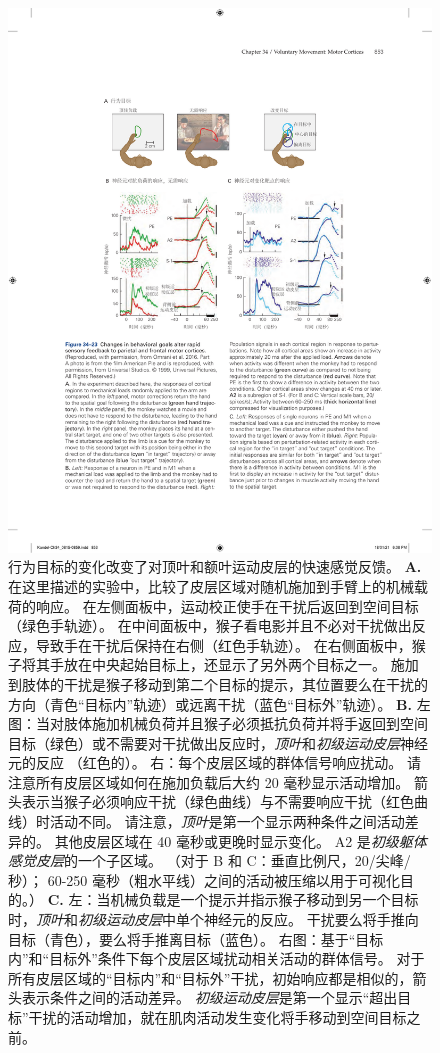 \begin{figure}[htbp]
	\centering
	\includegraphics[width=0.93\linewidth]{chap34/fig_34_23}
	\caption{行为目标的变化改变了对顶叶和额叶运动皮层的快速感觉反馈。
		\textbf{A.} 在这里描述的实验中，比较了皮层区域对随机施加到手臂上的机械载荷的响应。
		在左侧面板中，运动校正使手在干扰后返回到空间目标（绿色手轨迹）。
		在中间面板中，猴子看电影并且不必对干扰做出反应，导致手在干扰后保持在右侧（红色手轨迹）。
		在右侧面板中，猴子将其手放在中央起始目标上，还显示了另外两个目标之一。
		施加到肢体的干扰是猴子移动到第二个目标的提示，其位置要么在干扰的方向（青色“目标内”轨迹）或远离干扰（蓝色“目标外”轨迹）。
		\textbf{B.} 左图：当对肢体施加机械负荷并且猴子必须抵抗负荷并将手返回到空间目标（绿色）或不需要对干扰做出反应时，\textit{顶叶}和\textit{初级运动皮层}神经元的反应 （红色的）。
		右：每个皮层区域的群体信号响应扰动。 请注意所有皮层区域如何在施加负载后大约 20 毫秒显示活动增加。
		箭头表示当猴子必须响应干扰（绿色曲线）与不需要响应干扰（红色曲线）时活动不同。
		请注意，\textit{顶叶}是第一个显示两种条件之间活动差异的。 
		其他皮层区域在 40 毫秒或更晚时显示变化。
		A2 是\textit{初级躯体感觉皮层}的一个子区域。 （对于 B 和 C：垂直比例尺，20/尖峰/秒）；
		60-250 毫秒（粗水平线）之间的活动被压缩以用于可视化目的。）
		\textbf{C.} 左：当机械负载是一个提示并指示猴子移动到另一个目标时，\textit{顶叶}和\textit{初级运动皮层}中单个神经元的反应。
		干扰要么将手推向目标（青色），要么将手推离目标（蓝色）。
		右图：基于“目标内”和“目标外”条件下每个皮层区域扰动相关活动的群体信号。
		对于所有皮层区域的“目标内”和“目标外”干扰，初始响应都是相似的，箭头表示条件之间的活动差异。
		\textit{初级运动皮层}是第一个显示“超出目标”干扰的活动增加，就在肌肉活动发生变化将手移动到空间目标之前。}
	\label{fig:34_23}
\end{figure}


